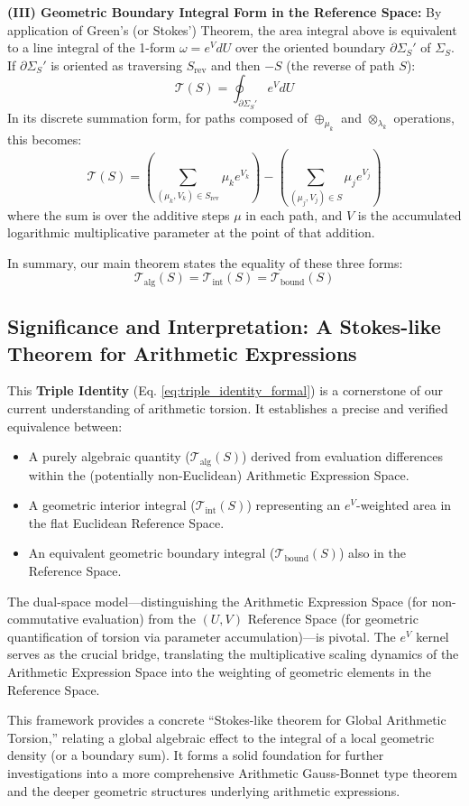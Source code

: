 \textbf{(III) Geometric Boundary Integral Form in the Reference Space:}
By application of Green's (or Stokes') Theorem, the area integral above is equivalent to a line integral of the 1-form $\omega = e^V dU$ over the oriented boundary $\partial \Sigma_S'$ of $\Sigma_S$. If $\partial \Sigma_S'$ is oriented as traversing $S_{\text{rev}}$ and then $-S$ (the reverse of path $S$):
\[ \mathcal{T}(S) = \oint_{\partial \Sigma_S'} e^V dU \]
In its discrete summation form, for paths composed of $\oplus_{\mu_k}$ and $\otimes_{\lambda_k}$ operations, this becomes:
\[ \mathcal{T}(S) = \left(\sum_{(\mu_k, V_k) \in S_{\text{rev}}} \mu_k e^{V_k}\right) - \left(\sum_{(\mu_j, V_j) \in S} \mu_j e^{V_j}\right) \]
where the sum is over the additive steps $\mu$ in each path, and $V$ is the accumulated logarithmic multiplicative parameter at the point of that addition.

In summary, our main theorem states the equality of these three forms:
\begin{equation}
\mathcal{T}_{\text{alg}}(S) = \mathcal{T}_{\text{int}}(S) = \mathcal{T}_{\text{bound}}(S)
\label{eq:triple_identity_formal}
\end{equation}

\subsection*{Significance and Interpretation: A Stokes-like Theorem for Arithmetic Expressions}

This \textbf{Triple Identity} (Eq. \ref{eq:triple_identity_formal}) is a cornerstone of our current understanding of arithmetic torsion. It establishes a precise and verified equivalence between:
\begin{itemize}
    \item A purely algebraic quantity ($\mathcal{T}_{\text{alg}}(S)$) derived from evaluation differences within the (potentially non-Euclidean) Arithmetic Expression Space.
    \item A geometric interior integral ($\mathcal{T}_{\text{int}}(S)$) representing an $e^V$-weighted area in the flat Euclidean Reference Space.
    \item An equivalent geometric boundary integral ($\mathcal{T}_{\text{bound}}(S)$) also in the Reference Space.
\end{itemize}
The dual-space model---distinguishing the Arithmetic Expression Space (for non-commutative evaluation) from the $(U,V)$ Reference Space (for geometric quantification of torsion via parameter accumulation)---is pivotal. The $e^V$ kernel serves as the crucial bridge, translating the multiplicative scaling dynamics of the Arithmetic Expression Space into the weighting of geometric elements in the Reference Space.

This framework provides a concrete ``Stokes-like theorem for Global Arithmetic Torsion,'' relating a global algebraic effect to the integral of a local geometric density (or a boundary sum). It forms a solid foundation for further investigations into a more comprehensive Arithmetic Gauss-Bonnet type theorem and the deeper geometric structures underlying arithmetic expressions.

